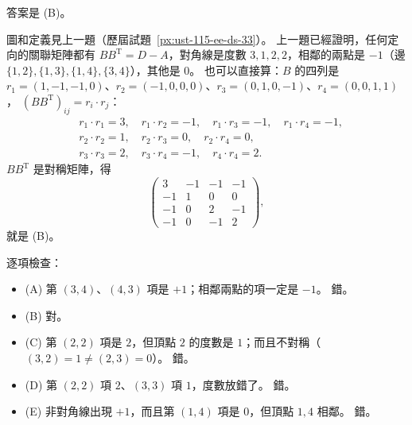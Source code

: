 \begin{pastsoln}
答案是 (B)。

圖和定義見上一題（歷屆試題~\ref{px:ust-115-ee-ds-33}）。 上一題已經證明，任何定向的關聯矩陣都有
$BB^{\mathrm T} = D - A$，對角線是度數 $3, 1, 2, 2$，相鄰的兩點是 $-1$（邊 $\{1,2\}, \{1,3\},
\{1,4\}, \{3,4\}$），其他是 $0$。 也可以直接算：$B$ 的四列是
$r_1 = (1, -1, -1, 0)$、$r_2 = (-1, 0, 0, 0)$、$r_3 = (0, 1, 0, -1)$、$r_4 = (0, 0, 1, 1)$，
$(BB^{\mathrm T})_{ij} = r_i \cdot r_j$：
\[
\begin{aligned}
&r_1 \cdot r_1 = 3, \quad r_1 \cdot r_2 = -1, \quad r_1 \cdot r_3 = -1, \quad r_1 \cdot r_4 = -1, \\
&r_2 \cdot r_2 = 1, \quad r_2 \cdot r_3 = 0, \quad r_2 \cdot r_4 = 0, \\
&r_3 \cdot r_3 = 2, \quad r_3 \cdot r_4 = -1, \quad r_4 \cdot r_4 = 2 .
\end{aligned}
\]
$BB^{\mathrm T}$ 是對稱矩陣，得
\[
\begin{pmatrix} 3 & -1 & -1 & -1 \\ -1 & 1 & 0 & 0 \\ -1 & 0 & 2 & -1 \\ -1 & 0 & -1 & 2 \end{pmatrix},
\]
就是 (B)。

逐項檢查：
\begin{itemize}
\item (A) 第 $(3,4)$、$(4,3)$ 項是 $+1$；相鄰兩點的項一定是 $-1$。 錯。
\item (B) 對。
\item (C) 第 $(2,2)$ 項是 $2$，但頂點 $2$ 的度數是 $1$；而且不對稱（$(3,2) = 1 \ne (2,3) = 0$）。 錯。
\item (D) 第 $(2,2)$ 項 $2$、$(3,3)$ 項 $1$，度數放錯了。 錯。
\item (E) 非對角線出現 $+1$，而且第 $(1,4)$ 項是 $0$，但頂點 $1, 4$ 相鄰。 錯。
\end{itemize}
\end{pastsoln}
